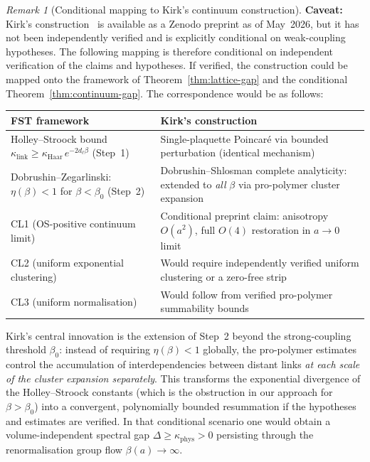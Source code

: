 \documentclass[12pt,a4paper]{article}
\theoremstyle{definition}
\theoremstyle{plain}
\theoremstyle{remark}
\newtheorem{remark}[definition]{Remark}
\begin{document}
\begin{remark}[Conditional mapping to Kirk's continuum construction]\label{rem:kirk-mapping}
\textbf{Caveat:} Kirk's construction~\cite{Kirk2026} is available as a Zenodo preprint as of May~2026, but it has not been independently verified and is explicitly conditional on weak-coupling hypotheses. The following mapping is therefore conditional on independent verification of the claims and hypotheses. If verified, the construction could be mapped onto the framework of Theorem~\ref{thm:lattice-gap} and the conditional Theorem~\ref{thm:continuum-gap}. The correspondence would be as follows:

\begin{center}
\small
\begin{tabularx}{\textwidth}{@{}Y Y@{}}
\toprule
\textbf{FST framework} & \textbf{Kirk's construction} \\
\midrule
Holley--Stroock bound $\kappa_{\mathrm{link}} \geq \kappa_{\mathrm{Haar}}\,
e^{-2 d_\ell \beta}$ (Step~1)
& Single-plaquette Poincar\'e via bounded perturbation
  (identical mechanism) \\[4pt]
Dobrushin--Zegarlinski: $\eta(\beta) < 1$ for $\beta < \beta_0$ (Step~2)
& Dobrushin--Shlosman complete analyticity:
  extended to \emph{all} $\beta$ via pro-polymer
  cluster expansion \\[4pt]
CL1 (OS-positive continuum limit)
& Conditional preprint claim: anisotropy $O(a^2)$, full $O(4)$
  restoration in $a \to 0$ limit \\[4pt]
CL2 (uniform exponential clustering)
& Would require independently verified uniform clustering or a zero-free strip \\[4pt]
CL3 (uniform normalisation)
& Would follow from verified pro-polymer summability bounds \\
\bottomrule
\end{tabularx}
\end{center}

\noindent
Kirk's central innovation is the extension of Step~2 beyond the
strong-coupling threshold $\beta_0$: instead of requiring $\eta(\beta) < 1$
globally, the pro-polymer estimates control the accumulation of
interdependencies between distant links \emph{at each scale of the
cluster expansion separately}. This transforms the exponential
divergence of the Holley--Stroock constants (which is the obstruction
in our approach for $\beta > \beta_0$) into a convergent,
polynomially bounded resummation if the hypotheses and estimates are
verified. In that conditional scenario one would obtain a volume-independent
spectral gap $\Delta \geq \kappa_{\mathrm{phys}} > 0$ persisting through
the renormalisation group flow $\beta(a) \to \infty$.


\end{remark}
\end{document}
